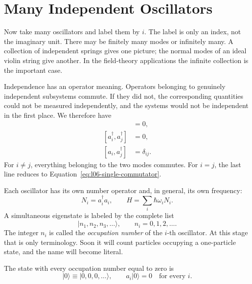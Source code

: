 \section{Many Independent Oscillators}

Now take many oscillators and label them by \(i\). The label is only an index, not the imaginary unit. There may be finitely many modes or infinitely many. A collection of independent springs gives one picture; the normal modes of an ideal violin string give another. In the field-theory applications the infinite collection is the important case.

Independence has an operator meaning. Operators belonging to genuinely independent subsystems commute. If they did not, the corresponding quantities could not be measured independently, and the systems would not be independent in the first place. We therefore have
\begin{align}
[a_i,a_j]&=0, \\
[a_i^\dagger,a_j^\dagger]&=0, \\
[a_i,a_j^\dagger]&=\delta_{ij}.
\label{eq:l06-many-commutators}
\end{align}
For \(i\ne j\), everything belonging to the two modes commutes. For \(i=j\), the last line reduces to Equation~\eqref{eq:l06-single-commutator}.

Each oscillator has its own number operator and, in general, its own frequency:
\begin{equation}
N_i=a_i^\dagger a_i,
\qquad
H=\sum_i\hbar\omega_i N_i.
\label{eq:l06-many-hamiltonian}
\end{equation}
A simultaneous eigenstate is labeled by the complete list
\begin{equation}
|n_1,n_2,n_3,\ldots\rangle,
\qquad n_i=0,1,2,\ldots.
\label{eq:l06-occupation-ket}
\end{equation}
The integer \(n_i\) is called the \emph{occupation number} of the \(i\)-th oscillator. At this stage that is only terminology. Soon it will count particles occupying a one-particle state, and the name will become literal.

The state with every occupation number equal to zero is
\begin{equation}
|0\rangle\equiv|0,0,0,\ldots\rangle,
\qquad a_i|0\rangle=0\quad\text{for every }i.
\label{eq:l06-oscillator-vacuum}
\end{equation}

\begin{classroomqa}
\end{classroomqa}

